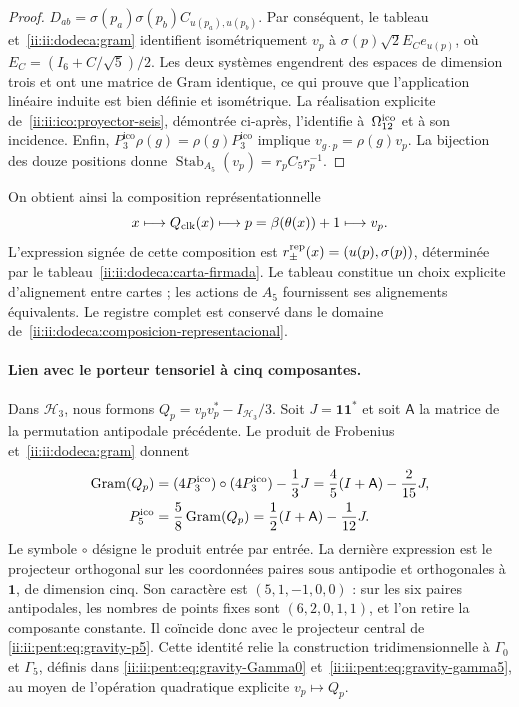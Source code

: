 \begin{proof}
\(D_{ab}=\sigma(p_a)\sigma(p_b)C_{u(p_a),u(p_b)}\).
Par conséquent, le tableau et~\eqref{ii:ii:dodeca:gram} identifient
isométriquement \(v_p\) à
\(\sigma(p)\sqrt2 E_Ce_{u(p)}\), où
\(E_C=(I_6+C/\sqrt5)/2\). Les deux systèmes engendrent des espaces de dimension
trois et ont une matrice de Gram identique, ce qui prouve que l’application
linéaire induite est bien définie et isométrique. La réalisation
explicite de~\eqref{ii:ii:ico:proyector-seis}, démontrée ci-après,
l’identifie à~\(\Omega_{12}^{\rm ico}\) et à son incidence.
Enfin, \(P_3^{\mathrm{ico}}\rho(g)=\rho(g)P_3^{\mathrm{ico}}\) implique
\(v_{g\cdot p}=\rho(g)v_p\). La bijection des douze positions donne
\(\operatorname{Stab}_{A_5}(v_p)=r_pC_5r_p^{-1}\).
\end{proof}

On obtient ainsi la composition représentationnelle
\begin{equation}
 x\longmapsto Q_{\rm clk}(x)\longmapsto
 p=\beta(\theta(x))+1\longmapsto v_p.
 \label{ii:ii:dodeca:composicion-representacional}
\end{equation}
L’expression signée de cette composition est
\(r_\pm^{\rm rep}(x)=(u(p),\sigma(p))\), déterminée par le
tableau~\eqref{ii:ii:dodeca:carta-firmada}. Le tableau constitue un choix explicite
d’alignement entre cartes ; les actions de \(A_5\) fournissent ses
alignements équivalents. Le registre complet est conservé dans le
domaine de~\eqref{ii:ii:dodeca:composicion-representacional}.

\paragraph{Lien avec le porteur tensoriel à cinq composantes.}
Dans \(\mathcal H_3\), nous formons
\(Q_p=v_pv_p^*-I_{\mathcal H_3}/3\). Soit \(J=\mathbf1\mathbf1^*\)
et soit \(\mathsf A\) la matrice de la permutation antipodale précédente.
Le produit de Frobenius et~\eqref{ii:ii:dodeca:gram} donnent
\begin{equation}
 \begin{aligned}
 \operatorname{Gram}(Q_p)
 &=(4P_3^{\mathrm{ico}})\circ(4P_3^{\mathrm{ico}})-\frac13J
 =\frac45(I+\mathsf A)-\frac2{15}J,
 \\
 P^{\rm ico}_5&=\frac58\operatorname{Gram}(Q_p)
 =\frac12(I+\mathsf A)-\frac1{12}J.
 \end{aligned}
 \label{ii:ii:dodeca:puente-tensorial}
\end{equation}
Le symbole \(\circ\) désigne le produit entrée par entrée. La dernière
expression est le projecteur orthogonal sur les coordonnées paires sous
antipodie et orthogonales à \(\mathbf1\), de dimension cinq. Son caractère
est \((5,1,-1,0,0)\) : sur les six paires antipodales, les nombres de
points fixes sont \((6,2,0,1,1)\), et l’on retire la composante constante.
Il coïncide donc avec le projecteur central de
\eqref{ii:ii:pent:eq:gravity-p5}. Cette identité relie la construction
tridimensionnelle à \(\Gamma_0\) et \(\Gamma_5\), définis dans
\eqref{ii:ii:pent:eq:gravity-Gamma0} et~\eqref{ii:ii:pent:eq:gravity-gamma5},
au moyen de l’opération quadratique explicite \(v_p\mapsto Q_p\).

